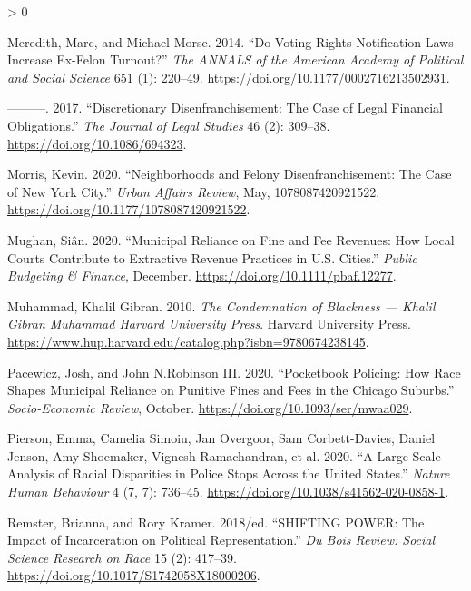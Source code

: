 \documentclass[
  12pt,
]{article}
\newlength{\cslhangindent}
\newenvironment{CSLReferences}[2] %
 {%
  \setlength{\parindent}{0pt}
  \ifodd #1 \everypar{\setlength{\hangindent}{\cslhangindent}}\ignorespaces\fi
  \ifnum #2 > 0
  \setlength{\parskip}{#2\baselineskip}
  \fi
 }%
 {}
\begin{document}
\begin{CSLReferences}{1}{0}
\leavevmode\hypertarget{ref-Meredith2014}{}%
Meredith, Marc, and Michael Morse. 2014. {``Do {Voting Rights Notification Laws Increase Ex}-{Felon Turnout}?''} \emph{The ANNALS of the American Academy of Political and Social Science} 651 (1): 220--49. \url{https://doi.org/10.1177/0002716213502931}.

\leavevmode\hypertarget{ref-Meredith2017}{}%
---------. 2017. {``Discretionary {Disenfranchisement}: {The Case} of {Legal Financial Obligations}.''} \emph{The Journal of Legal Studies} 46 (2): 309--38. \url{https://doi.org/10.1086/694323}.

\leavevmode\hypertarget{ref-Morris2020}{}%
Morris, Kevin. 2020. {``Neighborhoods and {Felony Disenfranchisement}: {The Case} of {New York City}.''} \emph{Urban Affairs Review}, May, 1078087420921522. \url{https://doi.org/10.1177/1078087420921522}.

\leavevmode\hypertarget{ref-Mughan2020}{}%
Mughan, Siân. 2020. {``Municipal {Reliance} on {Fine} and {Fee Revenues}: {How Local Courts Contribute} to {Extractive Revenue Practices} in {U}.{S}. {Cities}.''} \emph{Public Budgeting \& Finance}, December. \url{https://doi.org/10.1111/pbaf.12277}.

\leavevmode\hypertarget{ref-Muhammad2010}{}%
Muhammad, Khalil Gibran. 2010. \emph{The {Condemnation} of {Blackness} --- {Khalil Gibran Muhammad} \textbar{} {Harvard University Press}}. {Harvard University Press}. \url{https://www.hup.harvard.edu/catalog.php?isbn=9780674238145}.

\leavevmode\hypertarget{ref-Pacewicz2020}{}%
Pacewicz, Josh, and John N.Robinson III. 2020. {``Pocketbook Policing: {How} Race Shapes Municipal Reliance on Punitive Fines and Fees in the {Chicago} Suburbs.''} \emph{Socio-Economic Review}, October. \url{https://doi.org/10.1093/ser/mwaa029}.

\leavevmode\hypertarget{ref-Pierson2020}{}%
Pierson, Emma, Camelia Simoiu, Jan Overgoor, Sam Corbett-Davies, Daniel Jenson, Amy Shoemaker, Vignesh Ramachandran, et al. 2020. {``A Large-Scale Analysis of Racial Disparities in Police Stops Across the {United States}.''} \emph{Nature Human Behaviour} 4 (7, 7): 736--45. \url{https://doi.org/10.1038/s41562-020-0858-1}.

\leavevmode\hypertarget{ref-Remster2018}{}%
Remster, Brianna, and Rory Kramer. 2018/ed. {``{SHIFTING POWER}: {The Impact} of {Incarceration} on {Political Representation}.''} \emph{Du Bois Review: Social Science Research on Race} 15 (2): 417--39. \url{https://doi.org/10.1017/S1742058X18000206}.


\end{CSLReferences}
\end{document}
